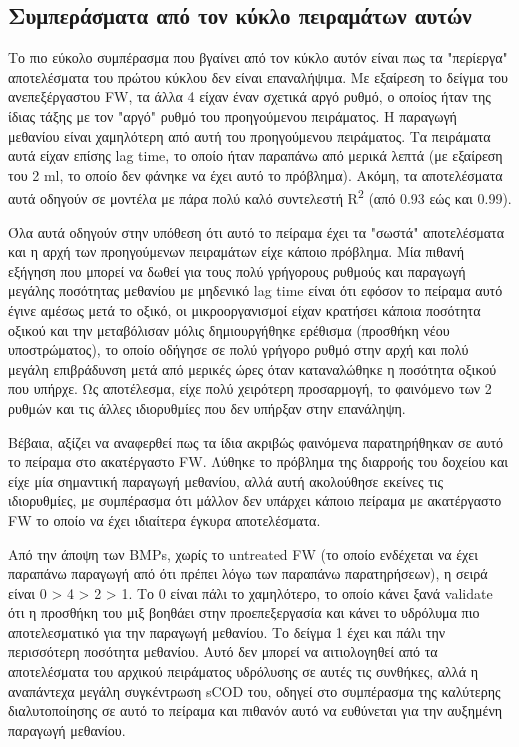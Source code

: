 \documentclass[11pt]{article}
\begin{document}
\subsection{Συμπεράσματα από τον κύκλο πειραμάτων αυτών}
\label{sec:orgc9bcd79}
Το πιο εύκολο συμπέρασμα που βγαίνει από τον κύκλο αυτόν είναι πως τα "περίεργα" αποτελέσματα του πρώτου κύκλου δεν είναι επαναλήψιμα. Με εξαίρεση το δείγμα του ανεπεξέργαστου FW, τα άλλα 4 είχαν έναν σχετικά αργό ρυθμό, ο οποίος ήταν της ίδιας τάξης με τον "αργό" ρυθμό του προηγούμενου πειράματος. Η παραγωγή μεθανίου είναι χαμηλότερη από αυτή του προηγούμενου πειράματος. Τα πειράματα αυτά είχαν επίσης lag time, το οποίο ήταν παραπάνω από μερικά λεπτά (με εξαίρεση του 2 ml, το οποίο δεν φάνηκε να έχει αυτό το πρόβλημα). Ακόμη, τα αποτελέσματα αυτά οδηγούν σε μοντέλα με πάρα πολύ καλό συντελεστή R\textsuperscript{2} (από 0.93 εώς και 0.99).

Όλα αυτά οδηγούν στην υπόθεση ότι αυτό το πείραμα έχει τα "σωστά" αποτελέσματα και η αρχή των προηγούμενων πειραμάτων είχε κάποιο πρόβλημα. Μία πιθανή εξήγηση που μπορεί να δωθεί για τους πολύ γρήγορους ρυθμούς και παραγωγή μεγάλης ποσότητας μεθανίου με μηδενικό lag time είναι ότι εφόσον το πείραμα αυτό έγινε αμέσως μετά το οξικό, οι μικροοργανισμοί είχαν κρατήσει κάποια ποσότητα οξικού και την μεταβόλισαν μόλις δημιουργήθηκε ερέθισμα (προσθήκη νέου υποστρώματος), το οποίο οδήγησε σε πολύ γρήγορο ρυθμό στην αρχή και πολύ μεγάλη επιβράδυνση μετά από μερικές ώρες όταν καταναλώθηκε η ποσότητα οξικού που υπήρχε. Ως αποτέλεσμα, είχε πολύ χειρότερη προσαρμογή, το φαινόμενο των 2 ρυθμών και τις άλλες ιδιορυθμίες που δεν υπήρξαν στην επανάληψη.

Βέβαια, αξίζει να αναφερθεί πως τα ίδια ακριβώς φαινόμενα παρατηρήθηκαν σε αυτό το πείραμα στο ακατέργαστο FW. Λύθηκε το πρόβλημα της διαρροής του δοχείου και είχε μία σημαντική παραγωγή μεθανίου, αλλά αυτή ακολούθησε εκείνες τις ιδιορυθμίες, με συμπέρασμα ότι μάλλον δεν υπάρχει κάποιο πείραμα με ακατέργαστο FW το οποίο να έχει ιδιαίτερα έγκυρα αποτελέσματα.

Από την άποψη των BMPs, χωρίς το untreated FW (το οποίο ενδέχεται να έχει παραπάνω παραγωγή από ότι πρέπει λόγω των παραπάνω παρατηρήσεων), η σειρά είναι 0 > 4 > 2 > 1. Το 0 είναι πάλι το χαμηλότερο, το οποίο κάνει ξανά validate ότι η προσθήκη του μιξ βοηθάει στην προεπεξεργασία και κάνει το υδρόλυμα πιο αποτελεσματικό για την παραγωγή μεθανίου. Το δείγμα 1 έχει και πάλι την περισσότερη ποσότητα μεθανίου. Αυτό δεν μπορεί να αιτιολογηθεί από τα αποτελέσματα του αρχικού πειράματος υδρόλυσης σε αυτές τις συνθήκες, αλλά η αναπάντεχα μεγάλη συγκέντρωση sCOD του, οδηγεί στο συμπέρασμα της καλύτερης διαλυτοποίησης σε αυτό το πείραμα και πιθανόν αυτό να ευθύνεται για την αυξημένη παραγωγή μεθανίου.
\end{document}
